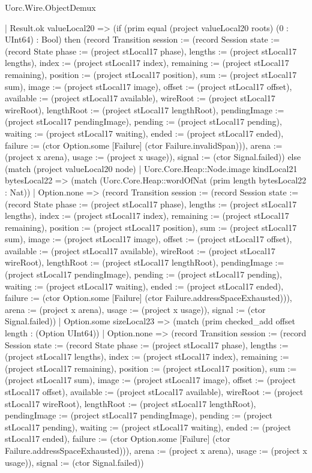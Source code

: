 \begin{lexlean}{Uorc.Wire.ObjectDemux}
\begin{semanticmodule}
{      | Result.ok valueLocal20 => (if (prim equal (project valueLocal20 roots) (0 : UInt64) : Bool) then (record Transition {session := (record Session {state := (record State {phase := (project stLocal17 phase), lengths := (project stLocal17 lengths), index := (project stLocal17 index), remaining := (project stLocal17 remaining), position := (project stLocal17 position), sum := (project stLocal17 sum), image := (project stLocal17 image), offset := (project stLocal17 offset), available := (project stLocal17 available), wireRoot := (project stLocal17 wireRoot), lengthRoot := (project stLocal17 lengthRoot), pendingImage := (project stLocal17 pendingImage), pending := (project stLocal17 pending), waiting := (project stLocal17 waiting), ended := (project stLocal17 ended), failure := (ctor Option.some [Failure] (ctor Failure.invalidSpan))}), arena := (project x arena), usage := (project x usage)}), signal := (ctor Signal.failed)}) else (match (project valueLocal20 node)
        | Uorc.Core.Heap::Node.image kindLocal21 bytesLocal22 => (match (Uorc.Core.Heap::wordOfNat (prim length bytesLocal22 : Nat))
          | Option.none => (record Transition {session := (record Session {state := (record State {phase := (project stLocal17 phase), lengths := (project stLocal17 lengths), index := (project stLocal17 index), remaining := (project stLocal17 remaining), position := (project stLocal17 position), sum := (project stLocal17 sum), image := (project stLocal17 image), offset := (project stLocal17 offset), available := (project stLocal17 available), wireRoot := (project stLocal17 wireRoot), lengthRoot := (project stLocal17 lengthRoot), pendingImage := (project stLocal17 pendingImage), pending := (project stLocal17 pending), waiting := (project stLocal17 waiting), ended := (project stLocal17 ended), failure := (ctor Option.some [Failure] (ctor Failure.addressSpaceExhausted))}), arena := (project x arena), usage := (project x usage)}), signal := (ctor Signal.failed)})
          | Option.some sizeLocal23 => (match (prim checked_add offset length : (Option UInt64))
            | Option.none => (record Transition {session := (record Session {state := (record State {phase := (project stLocal17 phase), lengths := (project stLocal17 lengths), index := (project stLocal17 index), remaining := (project stLocal17 remaining), position := (project stLocal17 position), sum := (project stLocal17 sum), image := (project stLocal17 image), offset := (project stLocal17 offset), available := (project stLocal17 available), wireRoot := (project stLocal17 wireRoot), lengthRoot := (project stLocal17 lengthRoot), pendingImage := (project stLocal17 pendingImage), pending := (project stLocal17 pending), waiting := (project stLocal17 waiting), ended := (project stLocal17 ended), failure := (ctor Option.some [Failure] (ctor Failure.addressSpaceExhausted))}), arena := (project x arena), usage := (project x usage)}), signal := (ctor Signal.failed)})
}
\end{semanticmodule}
\end{lexlean}
